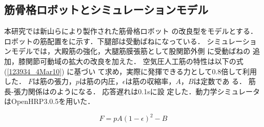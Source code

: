 \documentclass[10pt,a4paper]{jsarticle}
\begin{document}
\subsection{筋骨格ロボットとシミュレーションモデル}

本研究では新山らにより製作された筋骨格ロボット
\cite{Niiyama2008:Pneumatic_Biped_with_an_Artificial_Musculoskeletal_System}
の改良型をモデルとする．
ロボットの筋配置をに示す．下腿部は受動ばねになっている．
シミュレーションモデルでは，大殿筋の強化，大腿筋膜張筋として股関節外側
に受動ばねの
追加，膝関節可動域の拡大の改良を加えた．
空気圧人工筋の特性は以下の式(\ref{123934_4Mar10})
\cite{Schulte1961:Characteristics_of_the_Braided_Fluid_Actuator}に基づい
て求め，実際に発揮できる力として0.8倍して利用した．
$F$は筋の張力，$p$は筋の内圧，$\epsilon$は筋の収縮率，$A$，$B$は定数であ
る．
筋長-張力関係はのようになる．
応答遅れは0.1sに設
定した．動力学シミュレータはOpenHRP3.0.5\cite{Nakaoka2008:分散コンポーネント型ロボットシミュレータOpenHRP3}を用いた．

\begin{equation}
 F=p{A(1-\epsilon)^{2}-B}\label{123934_4Mar10}
\end{equation}



\end{document}
